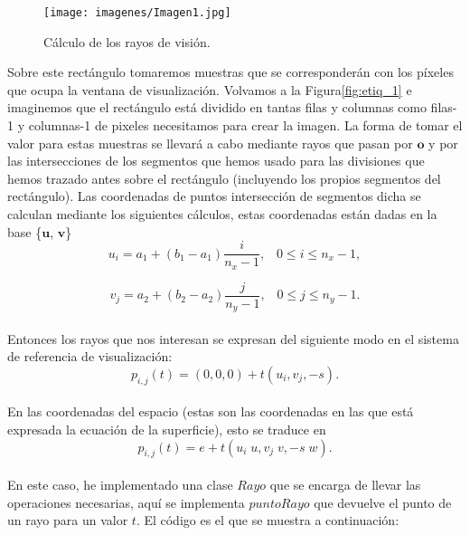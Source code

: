 \begin{figure}[h]
	\begin{center}
		\texttt{[image: imagenes/Imagen1.jpg]}
	\end{center}
	\caption{Cálculo de los rayos de visión.}
	\label{fig:etiq_3}
\end{figure}




Sobre este rectángulo tomaremos muestras que se corresponderán con los píxeles que ocupa la ventana de visualización. Volvamos a la Figura\ref{fig:etiq_1} e imaginemos que el rectángulo está dividido en tantas filas y columnas como filas-1 y columnas-1 de pixeles necesitamos para crear la imagen. La forma de tomar el valor para estas muestras se llevará a cabo mediante rayos que pasan por $\textbf{o}$ y por las intersecciones de los segmentos que hemos usado para las divisiones que hemos trazado antes sobre el rectángulo (incluyendo los propios segmentos del rectángulo). Las coordenadas de puntos intersección de segmentos dicha se calculan mediante los siguientes cálculos, estas coordenadas están dadas en la base \{$\textbf{u}$, $\textbf{v}$\}
${ }$\\


\[
	u_i = a_1 + (b_1-a_1) \frac{i}{n_x-1}, \;\;\; 0 \leq i \leq n_x -1,
\]

\[
	v_j = a_2 + (b_2-a_2) \frac{j}{n_y-1}, \;\;\; 0 \leq j \leq n_y -1.
\]
${ }$\\

Entonces los rayos que nos interesan se expresan del siguiente modo en el sistema de referencia de visualización:
${ }$\\

\[
	p_{i,j}(t) = (0,0,0) + t(u_i , v_j, -s).
\]
${ }$\\

En las coordenadas del espacio (estas son las coordenadas en las que está expresada la ecuación de la superficie), esto se traduce en 
${ }$\\
\[
	p_{i,j}(t) = e + t( u_i \; u, v_j \; v, -s \; w).
\]
${ }$\\

En este caso, he implementado una clase $Rayo$ que se encarga de llevar las operaciones necesarias, aquí se implementa $puntoRayo$ que devuelve el punto de un rayo para un valor $t$. El código es el que se muestra a continuación:
${ }$\\

